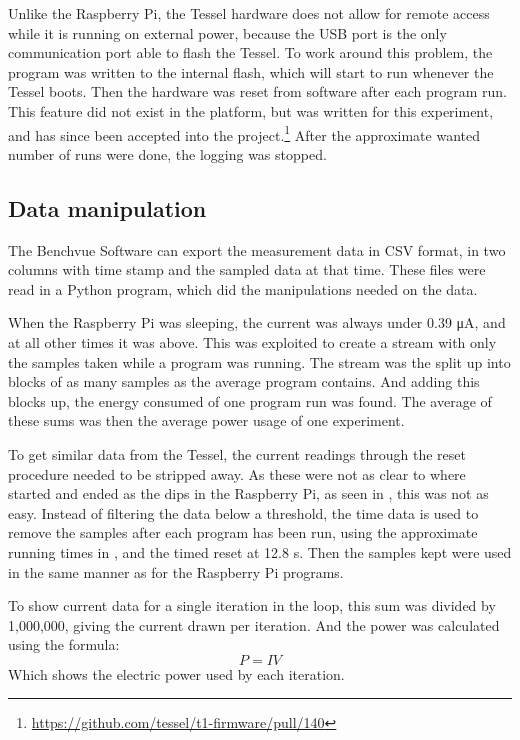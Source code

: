 Unlike the Raspberry Pi, the Tessel hardware does not allow for remote access while it is running on external power, because the USB port is the only communication port able to flash the Tessel.
To work around this problem, the program was written to the internal flash, which will start to run whenever the Tessel boots.
Then the hardware was reset from software after each program run.
This feature did not exist in the platform, but was written for this experiment, and has since been accepted into the project.\footnote{\url{https://github.com/tessel/t1-firmware/pull/140}}
After the approximate wanted number of runs were done, the logging was stopped.

\subsection{Data manipulation}
The Benchvue Software can export the measurement data in CSV format, in two columns with time stamp and the sampled data at that time.
These files were read in a Python program, which did the manipulations needed on the data.

When the Raspberry Pi was sleeping, the current was always under 0.39 \si{\micro\ampere}, and at all other times it was above.
This was exploited to create a stream with only the samples taken while a program was running.
The stream was the split up into blocks of as many samples as the average program contains.
And adding this blocks up, the energy consumed of one program run was found.
The average of these sums was then the average power usage of one experiment.

To get similar data from the Tessel, the current readings through the reset procedure needed to be stripped away.
As these were not as clear to where started and ended as the dips in the Raspberry Pi, as seen in , this was not as easy.
Instead of filtering the data below a threshold, the time data is used to remove the samples after each program has been run, using the approximate running times in , and the timed reset at 12.8 \si{\second}.
Then the samples kept were used in the same manner as for the Raspberry Pi programs.

To show current data for a single iteration in the loop, this sum was divided by 1,000,000, giving the current drawn per iteration.
And the power was calculated using the formula:
\[P = IV\]
Which shows the electric power used by each iteration.